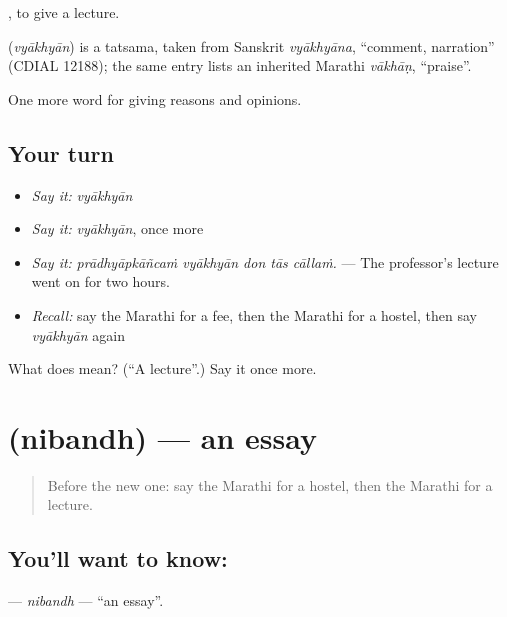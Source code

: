  , to give a lecture.

\begin{cousinweb}
\textbf{} (\emph{vyākhyān}) is a tatsama, taken from Sanskrit \emph{vyākhyāna}, \textquotedblleft{}comment, narration\textquotedblright{} (CDIAL 12188); the same entry lists an inherited Marathi \emph{vākhāṇ}, \textquotedblleft{}praise\textquotedblright{}.
\end{cousinweb}

\begin{grammarlens}[title={What you've built}]
One more word for giving reasons and opinions.
\end{grammarlens}

\subsection*{Your turn}
\begin{itemize}
\raggedright
  \item \emph{Say it:} \emph{vyākhyān}
  \item \emph{Say it:} \emph{vyākhyān}, once more
  \item \emph{Say it:} \emph{prādhyāpkāñcaṁ vyākhyān don tās cāllaṁ.} — The professor's lecture went on for two hours.
  \item \emph{Recall:} say the Marathi for a fee, then the Marathi for a hostel, then say \emph{vyākhyān} again
\end{itemize}

\begin{tcolorbox}[breakable,colback=teal!4,colframe=teal!35!black,title={Before you move on}]
What does  mean? (\textquotedblleft{}A lecture\textquotedblright{}.) Say it once more.
\end{tcolorbox}
\section[\texorpdfstring{\mr{निबंध} (nibandh)}{निबंध (nibandh)}]{ (nibandh) — an essay}

\label{lesson:MR-C370-nibandh}



\begin{quote}
Before the new one: say the Marathi for a hostel, then the Marathi for a lecture.
\end{quote}

\subsection*{You'll want to know: }
\textbf{} — \emph{nibandh} — \textquotedblleft{}an essay\textquotedblright{}.

